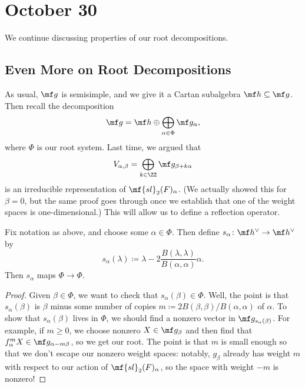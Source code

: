 \documentclass[../notes.tex]{subfiles}
\begin{document}
\section{October 30}
We continue discussing properties of our root decompositions.

\subsection{Even More on Root Decompositions}
As usual, $\mf g$ is semisimple, and we give it a Cartan subalgebra $\mf h\subseteq\mf g$. Then recall the decomposition
\[\mf g=\mf h\oplus\bigoplus_{\alpha\in\Phi}\mf g_{\alpha},\]
where $\Phi$ is our root system. Last time, we argued that
\[V_{\alpha,\beta}=\bigoplus_{k\in\ZZ}\mf g_{\beta+k\alpha}\]
is an irreducible representation of $\mf{sl}_2(F)_\alpha$. (We actually showed this for $\beta=0$, but the same proof goes through once we establish that one of the weight spaces is one-dimensional.) This will allow us to define a reflection operator.
\begin{lemma}
	Fix notation as above, and choose some $\alpha\in\Phi$. Then define $s_\alpha\colon\mf h^\lor\to\mf h^\lor$ by
	\[s_\alpha(\lambda)\coloneqq\lambda-2\frac{B(\lambda,\lambda)}{B(\alpha,\alpha)}\alpha.\]
	Then $s_\alpha$ maps $\Phi\to\Phi$.
\end{lemma}
\begin{proof}
	Given $\beta\in\Phi$, we want to check that $s_\alpha(\beta)\in\Phi$. Well, the point is that $s_\alpha(\beta)$ is $\beta$ minus some number of copies $m\coloneqq2B(\beta,\beta)/B(\alpha,\alpha)$ of $\alpha$. To show that $s_\alpha(\beta)$ lives in $\Phi$, we should find a nonzero vector in $\mf g_{s_\alpha(\beta)}$. For example, if $m\ge0$, we choose nonzero $X\in\mf g_\beta$ and then find that $f_\alpha^mX\in\mf g_{\alpha-m\beta}$, so we get our root. The point is that $m$ is small enough so that we don't escape our nonzero weight spaces: notably, $g_\beta$ already has weight $m$ with respect to our action of $\mf{sl}_2(F)_\alpha$, so the space with weight $-m$ is nonzero!
\end{proof}
\end{document}
